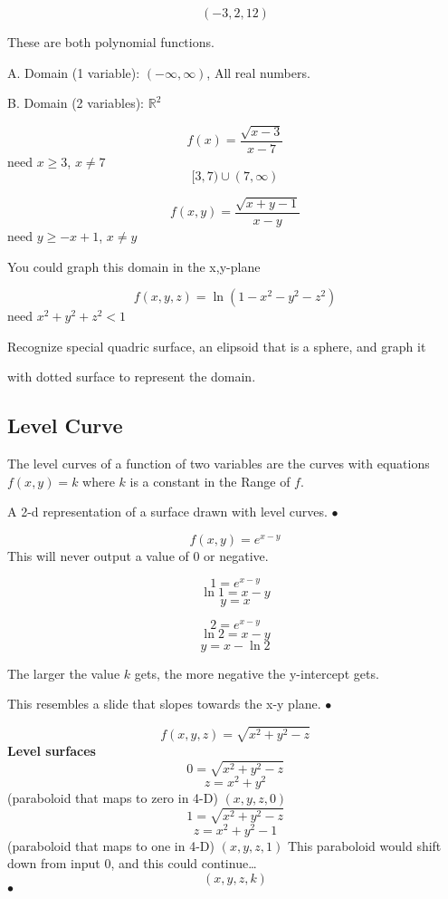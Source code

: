 \[(-3,2,12)\]


These are both polynomial functions.

A. Domain (1 variable): $(-\infty,\infty)$, All real numbers.

B. Domain (2 variables): $\mathbb{R}^2$

\[f(x) = \frac{\sqrt{x-3} }{x-7}\]
need $x \ge 3$, $x \neq 7$
\[[3,7)\cup (7,\infty)\]

\[f(x,y) = \frac{\sqrt{x + y -1} }{x-y} \]
need $y \ge -x +1$, $x \neq y$

You could graph this domain in the x,y-plane

\[f(x,y,z) = \ln (1 -x^2 -y^2 -z^2)\]
need $x^2 + y^2 + z^2 < 1$

Recognize special quadric surface, an elipsoid that is a sphere, and graph it

with dotted surface to represent the domain.

\subsection{Level Curve}%
\label{sub:level_curve}

The level curves of a function of two variables are the curves with equations $f(x,y) = k$ where
$k$ is a constant in the Range of $f$.

\begin{definition}
	A 2-d representation of a surface drawn with level curves.
\smallskip\hfill$\bullet$\end{definition}

\begin{example}
	\[f(x,y) = e^{x-y}\]
	This will never output a value of 0 or negative.

	\[1 = e^{x-y}\]
	\[\ln1 = x-y\]
	\[y=x\]

	\[2 = e^{x-y}\]
	\[\ln2 = x-y\]
	\[y=x - \ln2\]

	The larger the value $k$ gets, the more negative the y-intercept gets.

	This resembles a slide that slopes towards the x-y plane.
\smallskip\hfill$\bullet$\end{example}

\begin{example}[]
	\[f(x,y,z) = \sqrt{x^2+y^2-z} \]
\textbf{Level surfaces}
	\[0 = \sqrt{x^2+y^2-z} \]
\[z = x^2 + y ^2 \]
(paraboloid that maps to zero in 4-D) $(x,y,z,0)$
	\[1 = \sqrt{x^2+y^2-z} \]
\[z = x^2 + y ^2 -1 \]
(paraboloid that maps to one in 4-D) $(x,y,z,1)$
This paraboloid would shift down from input 0, and this could continue\ldots
\[(x,y,z,k)\]
\smallskip\hfill$\bullet$\end{example}

\newpage


